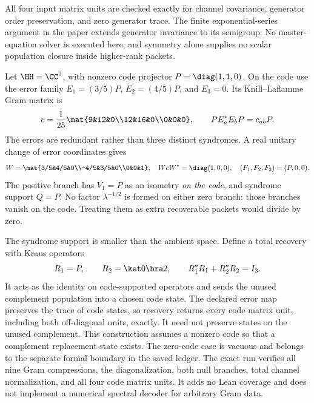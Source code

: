 All four input matrix units are checked exactly for channel covariance, generator order preservation, and zero generator trace. The finite exponential-series argument in the paper extends generator invariance to its semigroup. No master-equation solver is executed here, and symmetry alone supplies no scalar population closure inside higher-rank packets.

Let $\HH=\CC^3$, with nonzero code projector $P=\diag(1,1,0)$. On the code use the error family $E_1=(3/5)P$, $E_2=(4/5)P$, and $E_3=0$. Its Knill--Laflamme Gram matrix is
\[
c=\frac1{25}\mat{9&12&0\\12&16&0\\0&0&0},
\qquad PE_a^*E_bP=c_{ab}P.
\]
The errors are redundant rather than three distinct syndromes. A real unitary change of error coordinates gives
\[
W=\mat{3/5&4/5&0\\-4/5&3/5&0\\0&0&1},
\quad WcW^*=\diag(1,0,0),
\quad(F_1,F_2,F_3)=(P,0,0).
\]
The positive branch has $V_1=P$ as an isometry \emph{on the code}, and syndrome support $Q=P$. No factor $\lambda^{-1/2}$ is formed on either zero branch: those branches vanish on the code. Treating them as extra recoverable packets would divide by zero.

The syndrome support is smaller than the ambient space. Define a total recovery with Kraus operators
\[
R_1=P,\qquad R_2=\ket0\bra2,
\qquad R_1^*R_1+R_2^*R_2=I_3.
\]
It acts as the identity on code-supported operators and sends the unused complement population into a chosen code state. The declared error map preserves the trace of code states, so recovery returns every code matrix unit, including both off-diagonal units, exactly. It need not preserve states on the unused complement.
This construction assumes a nonzero code so that a complement replacement state exists. The zero-code case is vacuous and belongs to the separate formal boundary in the saved ledger. The exact run verifies all nine Gram compressions, the diagonalization, both null branches, total channel normalization, and all four code matrix units. It adds no Lean coverage and does not implement a numerical spectral decoder for arbitrary Gram data.

